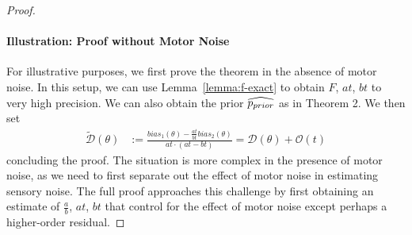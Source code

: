 \begin{proof}
\paragraph*{Illustration: Proof without Motor Noise}
For illustrative purposes, we first prove the theorem in the absence of motor noise.
In this setup, we can use Lemma~\ref{lemma:f-exact} to obtain $F$, $at$, $bt$ to very high precision. We can also obtain the prior $\widehat{p_{prior}}$ as in Theorem 2.
We then set
\begin{align*}
    \tilde{\mathcal{D}}(\theta) &:= \frac{bias_1(\theta) - \frac{at}{bt} bias_2(\theta)}{at \cdot (at - bt)} = \mathcal{D}(\theta)  + \mathcal{O}(t)
    \end{align*}
    concluding the proof.
The situation is more complex in the presence of motor noise, as we need to first separate out the effect of motor noise in estimating sensory noise. 
The full proof approaches this challenge by first obtaining an estimate of $\frac{a}{b}$, $at$, $bt$ that control for the effect of motor noise except perhaps a higher-order residual.
    
    

\end{proof}

